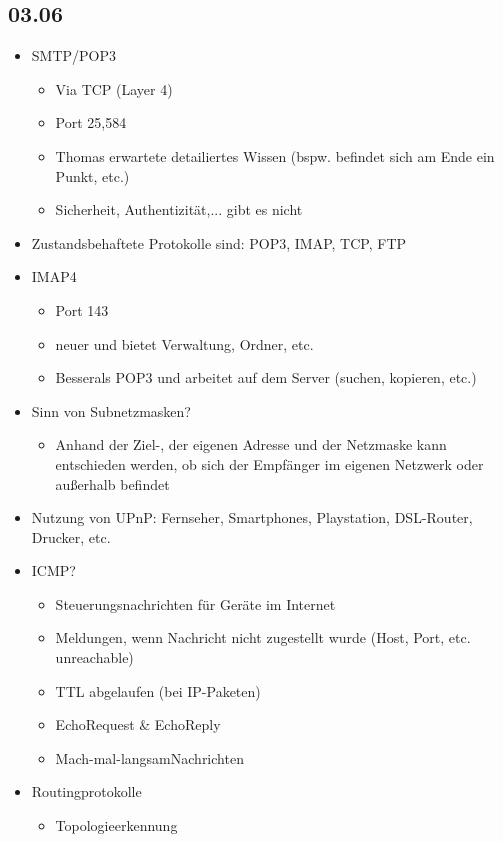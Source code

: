 \documentclass{article} %
\begin{document}
	\subsection{03.06}
	\begin{itemize}
		\item SMTP/POP3
		\begin{itemize}
			\item Via TCP (Layer 4)
			\item Port 25,584
			\item Thomas erwartete detailiertes Wissen (bspw. befindet sich am Ende ein Punkt, etc.)
			\item Sicherheit, Authentizität,... gibt es nicht
		\end{itemize}
		\item Zustandsbehaftete Protokolle sind: POP3, IMAP, TCP, FTP
		\item IMAP4
		\begin{itemize}
			\item Port 143
			\item neuer und bietet Verwaltung, Ordner, etc.
			\item \glqq Besser\grqq als POP3 und arbeitet auf dem Server (suchen, kopieren, etc.)
		\end{itemize}
		\item Sinn von Subnetzmasken?
		\begin{itemize}
			\item Anhand der Ziel-, der eigenen Adresse und der Netzmaske kann entschieden werden, ob sich der Empfänger im eigenen Netzwerk oder außerhalb befindet
		\end{itemize}
		\item Nutzung von UPnP: Fernseher, Smartphones, Playstation, DSL-Router, Drucker, etc.
		\item ICMP?
		\begin{itemize}
			\item Steuerungsnachrichten für Geräte im Internet
			\item Meldungen, wenn Nachricht nicht zugestellt wurde (Host, Port, etc. unreachable)
			\item TTL abgelaufen (bei IP-Paketen)
			\item EchoRequest \& EchoReply
			\item \glqq Mach-mal-langsam\grqq Nachrichten			
		\end{itemize}
		\item Routingprotokolle
		\begin{itemize}
			\item Topologieerkennung

\end{itemize}
\end{itemize}
\end{document}
